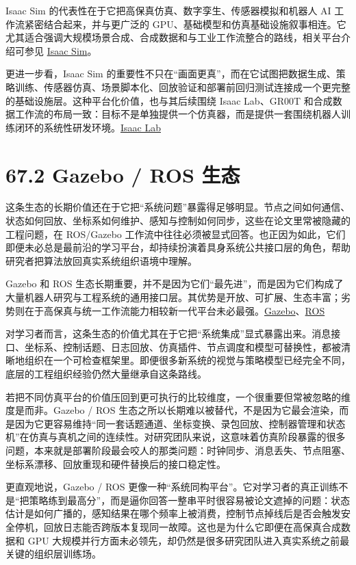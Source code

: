 Isaac Sim 的代表性在于它把高保真仿真、数字孪生、传感器模拟和机器人 AI 工作流紧密结合起来，并与更广泛的 GPU、基础模型和仿真基础设施叙事相连。它尤其适合强调大规模场景合成、合成数据和与工业工作流整合的路线，相关平台介绍可参见 \href{https://developer.nvidia.com/isaac/sim}{Isaac Sim}。

更进一步看，Isaac Sim 的重要性不只在“画面更真”，而在它试图把数据生成、策略训练、传感器仿真、场景脚本化、回放验证和部署前回归测试连接成一个更完整的基础设施层。这种平台化价值，也与其后续围绕 Isaac Lab、GR00T 和合成数据工作流的布局一致：目标不是单独提供一个仿真器，而是提供一套围绕机器人训练闭环的系统性研发环境。\href{https://isaac-sim.github.io/IsaacLab/}{Isaac Lab}

\section*{67.2 Gazebo / ROS 生态}


这条生态的长期价值还在于它把“系统问题”暴露得足够明显。节点之间如何通信、状态如何回放、坐标系如何维护、感知与控制如何同步，这些在论文里常被隐藏的工程问题，在 ROS/Gazebo 工作流中往往必须被显式回答。也正因为如此，它们即便未必总是最前沿的学习平台，却持续扮演着具身系统公共接口层的角色，帮助研究者把算法放回真实系统组织语境中理解。

Gazebo 和 ROS 生态长期重要，并不是因为它们“最先进”，而是因为它们构成了大量机器人研究与工程系统的通用接口层。其优势是开放、可扩展、生态丰富；劣势则在于高保真与统一工作流能力相较新一代平台未必最强。\href{https://gazebosim.org/home}{Gazebo}、\href{https://www.ros.org/}{ROS}

对学习者而言，这条生态的价值尤其在于它把“系统集成”显式暴露出来。消息接口、坐标系、控制话题、日志回放、仿真插件、节点调度和模型可替换性，都被清晰地组织在一个可检查框架里。即便很多新系统的视觉与策略模型已经完全不同，底层的工程组织经验仍然大量继承自这条路线。

若把不同仿真平台的价值压回到更可执行的比较维度，一个很重要但常被忽略的维度是\texttt{}而非\texttt{}。Gazebo / ROS 生态之所以长期难以被替代，不是因为它最会渲染，而是因为它更容易维持“同一套话题通道、坐标变换、录包回放、控制器管理和状态机”在仿真与真机之间的连续性。对研究团队来说，这意味着仿真阶段暴露的很多问题，本来就是部署阶段最会咬人的那类问题：时钟同步、消息丢失、节点阻塞、坐标系漂移、回放重现和硬件替换后的接口稳定性。

更直观地说，Gazebo / ROS 更像一种“系统同构平台”。它对学习者的真正训练不是“把策略练到最高分”，而是逼你回答一整串平时很容易被论文遮掉的问题：状态估计是如何广播的，感知结果在哪个频率上被消费，控制节点掉线后是否会触发安全停机，回放日志能否跨版本复现同一故障。这也是为什么它即便在高保真合成数据和 GPU 大规模并行方面未必领先，却仍然是很多研究团队进入真实系统之前最关键的组织层训练场。

